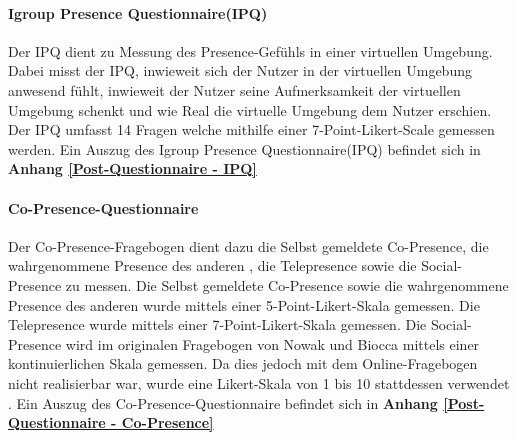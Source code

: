 \documentclass[a4paper,11pt]{article}%
\renewcommand{\\}{\vspace*{0.5\baselineskip} \newline}
\begin{document}
		\paragraph{Igroup Presence Questionnaire(IPQ)}
Der IPQ dient zu Messung des Presence-Gefühls in einer virtuellen Umgebung. Dabei misst der IPQ, inwieweit sich der Nutzer in der virtuellen Umgebung anwesend fühlt, inwieweit der Nutzer seine Aufmerksamkeit der virtuellen Umgebung schenkt und wie Real die virtuelle Umgebung dem Nutzer erschien. Der IPQ umfasst 14 Fragen welche mithilfe einer 7-Point-Likert-Scale gemessen werden.
\\Ein Auszug des Igroup Presence Questionnaire(IPQ) befindet sich in \textbf{Anhang \ref{Post-Questionnaire - IPQ}}
		
		\paragraph{Co-Presence-Questionnaire}
Der Co-Presence-Fragebogen dient dazu die Selbst gemeldete Co-Presence, die wahrgenommene Presence des \dq{}anderen \dq{}, die Telepresence sowie die Social-Presence zu messen. Die Selbst gemeldete Co-Presence sowie die wahrgenommene Presence des \dq{}anderen \dq{} wurde mittels einer 5-Point-Likert-Skala gemessen. Die Telepresence wurde mittels einer 7-Point-Likert-Skala gemessen. Die Social-Presence wird im originalen Fragebogen von Nowak und Biocca mittels einer kontinuierlichen Skala gemessen. Da dies jedoch mit dem Online-Fragebogen nicht realisierbar war, wurde eine Likert-Skala von 1 bis 10 stattdessen verwendet \citep[p.487]{nowak2004effect}.
Ein Auszug des Co-Presence-Questionnaire befindet sich in \textbf{Anhang \ref{Post-Questionnaire - Co-Presence}}
\end{document}
